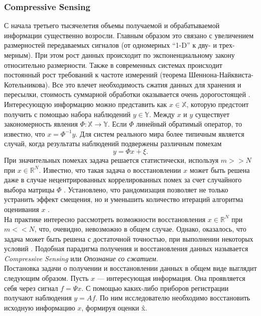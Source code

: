 \documentclass[14pt]{matmex-diploma-custom}
\begin{document}
\subsubsection{Compressive Sensing} \label{sec:cs_description}
С начала третьего тысячелетия объемы получаемой и обрабатываемой информации существенно возросли. Главным образом это связано с увеличением размерностей передаваемых сигналов (от одномерных ``1-D'' к дву- и  трех- мерным). При этом рост данных происходит по экспоненциальному закону относительно размерности. Также в современных системах происходит постоянный рост требований к частоте измерений (теорема Шеннона-Найквис\-та-Котель\-никова). Все это влечет необходимость сжатия данных для хранения и пересылки, стоимость суммарной обработки оказывается очень дорогостоящей \cite{граничин2010рандомизация}.
Интересующую информацию можно представить как $x \in \mathbb{X}$, которую предстоит получить с помощью набора наблюдений $y \in \mathbb{Y}$. Между $x$ и $y$ существует закономерность явления $\Phi:\mathbb{X}\to\mathbb{Y}$. Если $\Phi$ линейный обратимый оператор, то известно, что $x = \Phi^{-1}y $. Для систем реального мира более типичным является случай, когда результаты наблюдений подвержены различным помехам \[y = \Phi x + \xi.\]
При значительных помехах задача решается статистически, используя $m >> N$ при $x \in \mathbb{R}^N$. Известно, что такая задача о восстановлении $x$ может быть решена даже в случае нецентрированных коррелированных помех за счет случайного выбора матрицы $\Phi$ \cite{granichin2004linear}. Установлено, что рандомизация позволяет не только устранить эффект смещения, но и уменьшить количество итераций алгоритма оценивания $x$ \cite{граничин2003рандомизированные}. \\

На практике интересно рассмотреть возможности восстановления $x \in \mathbb{R}^N$ при $m << N$, что, очевидно, невозможно в общем случае. Однако, оказалось, что задача может быть решена с достаточной точностью, при выполнении некоторых условий \cite{donoho2006compressed}. Подобная парадигма получения и восстановления данных называется \textit{Compressive Sensing} или \textit{Опознание со сжатием}. \\

Постановка задачи о получении и восстановлении данных в общем виде выглядит следующим образом. Пусть $x$ --- интересующая информация. Она проявляется себя через сигнал $f = \Psi x$. С помощью каких-либо приборов регистрации получают наблюдения $y = A f$. По ним исследователю необходимо восстановить исходную информацию $x$, формируя оценки \^{x}. \\
\end{document}

